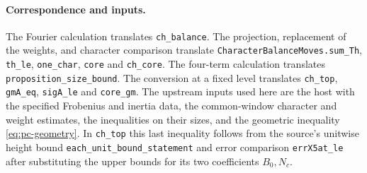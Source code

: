 \paragraph{Correspondence and inputs.}
The Fourier calculation translates \texttt{ch\_\allowbreak{}balance}.
The projection, replacement of the weights, and character comparison
translate \texttt{Character\allowbreak{}Balance\allowbreak{}Moves.\allowbreak{}sum\_\allowbreak{}Th}, \texttt{th\_\allowbreak{}le},
\texttt{one\_\allowbreak{}char}, \texttt{core} and \texttt{ch\_\allowbreak{}core}.
The four-term calculation translates \texttt{proposition\_\allowbreak{}size\_\allowbreak{}bound}.
The conversion at a fixed level translates \texttt{ch\_\allowbreak{}top},
\texttt{gm\allowbreak{}A\_\allowbreak{}eq}, \texttt{sig\allowbreak{}A\_\allowbreak{}le} and \texttt{core\_\allowbreak{}gm}.
The upstream inputs used here are the host with the specified
Frobenius and inertia data, the common-window character and weight
estimates, the inequalities on their sizes, and the geometric
inequality \eqref{eq:pc-geometry}. In \texttt{ch\_\allowbreak{}top} this last
inequality follows from the source's unitwise height bound
\texttt{each\_\allowbreak{}unit\_\allowbreak{}bound\_\allowbreak{}statement} and error comparison
\texttt{err\allowbreak{}X5at\_\allowbreak{}le} after substituting the upper bounds for its
two coefficients \(B_0,N_c\).
